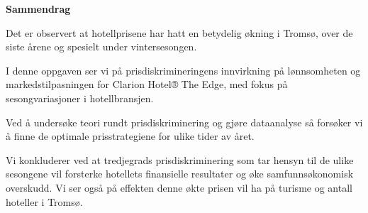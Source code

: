 \documentclass[
  12pt,
  a4paper,
  DIV=11,
  numbers=noendperiod]{scrartcl}
\begin{document}







\thispagestyle{plain}
\begin{center}
    \Large
    \textbf{Sammendrag}
\end{center}


Det er observert at hotellprisene har hatt en betydelig økning i Tromsø, over de siste årene og spesielt under vintersesongen.



I denne oppgaven ser vi på prisdiskrimineringens innvirkning på lønnsomheten og markedstilpasningen for Clarion Hotel® The Edge, med fokus på sesongvariasjoner i hotellbransjen. 


Ved å undersøke teori rundt prisdiskriminering og gjøre dataanalyse så forsøker vi å finne de optimale prisstrategiene for ulike tider av året. 

Vi konkluderer ved at tredjegrads prisdiskriminering som tar hensyn til de ulike sesongene vil forsterke hotellets finansielle resultater og øke samfunnsøkonomisk overskudd. Vi ser også på effekten denne økte prisen vil ha på turisme og antall hoteller i Tromsø.
\end{document}
